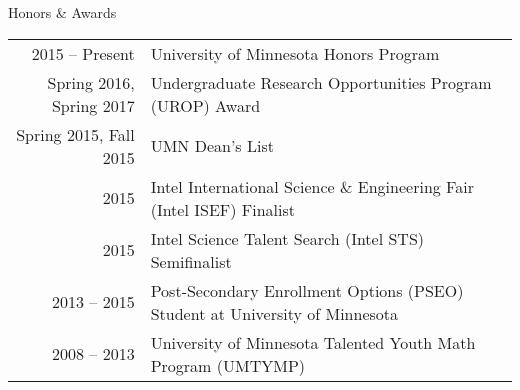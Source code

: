 \begin{rSection}{Honors \& Awards}

  \begin{tabularx}{\linewidth}{r|X}
    2015 -- Present & University of Minnesota Honors Program \\
    Spring 2016, Spring 2017 & Undergraduate Research Opportunities Program (UROP) Award \\
    Spring 2015, Fall 2015 & UMN Dean's List \\
    2015 & Intel International Science \& Engineering Fair (Intel ISEF) Finalist \\
    2015 & Intel Science Talent Search (Intel STS) Semifinalist \\
    2013 -- 2015 & Post-Secondary Enrollment Options (PSEO) Student at University of Minnesota\\
    2008 -- 2013 & University of Minnesota Talented Youth Math Program (UMTYMP)
  \end{tabularx}
\end{rSection}
